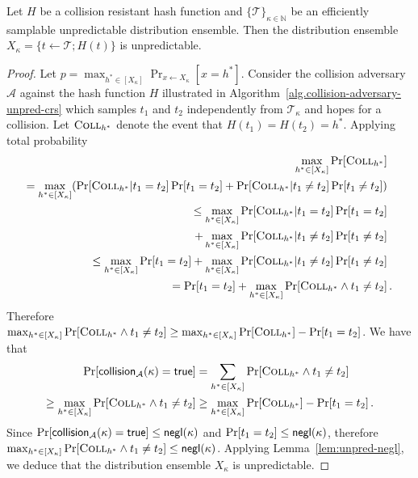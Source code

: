 \begin{lemma}
  Let $H$ be a collision resistant hash function and $\{\mathcal{T}\}_{\kappa\in\mathbb{N}}$ be an
  efficiently samplable unpredictable distribution ensemble. Then the
  distribution ensemble $X_\kappa = \{ t \gets \mathcal{T}; H(t) \}$ is unpredictable.
\end{lemma}
\begin{proof}
  Let $p = \max_{h^* \in [X_\kappa]}\Pr_{x \gets X_\kappa}[x = h^*]$.
  Consider the collision adversary $\mathcal{A}$ against the hash function $H$ illustrated in Algorithm~\ref{alg.collision-adversary-unpred-crs} which samples $t_1$ and $t_2$ independently from $\mathcal{T}_\kappa$ and hopes for a collision. Let $\textsc{Coll}_{h^*}$ denote the event that $H(t_1) = H(t_2) = h^*$.
  Applying total probability
  \begin{align*}
  \max_{h^* \in [X_\kappa]}\Pr[\textsc{Coll}_{h^*}]&
  \\=
  \max_{h^* \in [X_\kappa]}(\Pr[\textsc{Coll}_{h^*}|t_1 = t_2]\Pr[t_1 = t_2]
   + \Pr[\textsc{Coll}_{h^*}|t_1 \neq t_2]\Pr[t_1 \neq t_2])&
  \\\leq
  \max_{h^* \in [X_\kappa]}\Pr[\textsc{Coll}_{h^*}|t_1 = t_2]\Pr[t_1 = t_2]&
  \\ + \max_{h^* \in [X_\kappa]}\Pr[\textsc{Coll}_{h^*}|t_1 \neq t_2]\Pr[t_1 \neq t_2]&
  \\\leq
  \max_{h^* \in [X_\kappa]}\Pr[t_1 = t_2]
  + \max_{h^* \in [X_\kappa]}\Pr[\textsc{Coll}_{h^*}|t_1 \neq t_2]\Pr[t_1 \neq t_2]&
  \\=
  \Pr[t_1 = t_2]
  + \max_{h^* \in [X_\kappa]}\Pr[\textsc{Coll}_{h^*} \land t_1 \neq t_2]&
  \,.
  \end{align*}
  Therefore $\max_{h^* \in [X_\kappa]}\Pr[\textsc{Coll}_{h^*} \land t_1 \neq t_2] \geq \max_{h^* \in [X_\kappa]}\Pr[\textsc{Coll}_{h^*}] - \Pr[t_1 = t_2]$.
  We have that
  \begin{align*}
    \Pr[\textsf{collision}_{\mathcal{A}}(\kappa) = \mathsf{true}] &=
    \sum_{h^* \in [X_\kappa]} \Pr[\textsc{Coll}_{h^*} \land t_1 \neq t_2]\\\geq
    \max_{h^* \in [X_\kappa]} \Pr[\textsc{Coll}_{h^*} \land t_1 \neq t_2]
    &\geq
    \max_{h^* \in [X_\kappa]}\Pr[\textsc{Coll}_{h^*}] - \Pr[t_1 = t_2]\,.
  \end{align*}
 Since $\Pr[\textsf{collision}_{\mathcal{A}}(\kappa) = \mathsf{true}] \leq \textsf{negl}(\kappa)$
 and $\Pr[t_1 = t_2] \leq \textsf{negl}(\kappa)$, therefore $\max_{h^* \in [X_\kappa]} \Pr[\textsc{Coll}_{h^*} \land t_1 \neq t_2] \leq \textsf{negl}(\kappa)$. Applying Lemma~\ref{lem:unpred-negl}, we deduce that the distribution ensemble $X_\kappa$ is unpredictable.
\end{proof}

